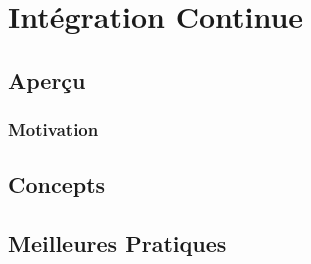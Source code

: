 \chapter{Intégration Continue}
\label{chap:integrationcontinue}

\nocite{duvall:conint}

\section{Aperçu}

\subsection{Motivation}

\section{Concepts}

\section{Meilleures Pratiques}
